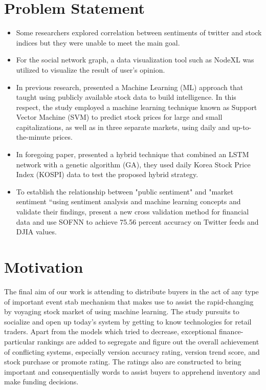 \section{Problem Statement}
\begin{itemize}
    \item Some researchers explored correlation between sentiments of twitter and stock indices but they were unable to meet the main goal.
    \item For the social network graph, a data visualization tool such as NodeXL was utilized to visualize the result of user's opinion.
    \item In previous research, presented a Machine Learning (ML) approach that taught using publicly available stock data to build intelligence. In this respect, the study employed a machine learning technique known as Support Vector Machine (SVM) to predict stock prices for large and small capitalizations, as well as in three separate markets, using daily and up-to-the-minute prices.
    \item In foregoing paper, presented a hybrid technique that combined an LSTM network with a genetic algorithm (GA), they used daily Korea Stock Price Index (KOSPI) data to test the proposed hybrid strategy. 
    \item To establish the relationship between "public sentiment" and "market sentiment “using sentiment analysis and machine learning concepts and validate their findings, present a new cross validation method for financial data and use SOFNN to achieve 75.56 percent accuracy on Twitter feeds and DJIA values.
\end{itemize}


\section{Motivation}
The final aim of our work is attending to distribute buyers in the act of any type of important event stab mechanism that makes use to assist the rapid-changing by voyaging stock market of using machine learning. The study pursuits to socialize and open up today’s system by getting to know technologies for retail traders. Apart from the models which tried to decrease, exceptional finance-particular rankings are added to segregate and figure out the overall achievement of conflicting systems, especially version accuracy rating, version trend score, and stock purchase or promote rating. The ratings also are constructed to bring important and consequentially words to assist buyers to apprehend inventory and make funding decisions.\\


